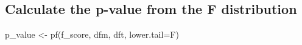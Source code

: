\documentclass[
]{article}
\newenvironment{Shaded}{\begin{snugshade}}{\end{snugshade}}
\newcommand{\AttributeTok}[1]{\textcolor[rgb]{0.77,0.63,0.00}{#1}}
\newcommand{\FunctionTok}[1]{\textcolor[rgb]{0.00,0.00,0.00}{#1}}
\newcommand{\NormalTok}[1]{#1}
\newcommand{\OtherTok}[1]{\textcolor[rgb]{0.56,0.35,0.01}{#1}}
\begin{document}
\hypertarget{calculate-the-p-value-from-the-f-distribution}{%
\subsection{Calculate the p-value from the F
distribution}\label{calculate-the-p-value-from-the-f-distribution}}

\begin{Shaded}
\begin{Highlighting}[]
\NormalTok{p\_value }\OtherTok{\textless{}{-}} \FunctionTok{pf}\NormalTok{(f\_score, dfm, dft, }\AttributeTok{lower.tail=}\NormalTok{F)}
\end{Highlighting}
\end{Shaded}
\end{document}
